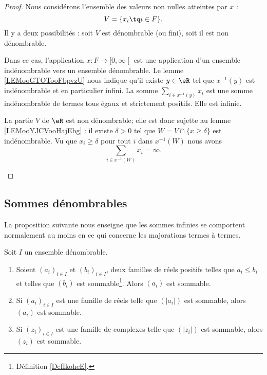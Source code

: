 \begin{proof}
	Nous considérons l'ensemble des valeurs non nulles atteintes par \( x\) :
	\begin{equation}
		V=\{ x_i\tq i\in F \}.
	\end{equation}
	Il y a deux possibilités : soit \( V\) est dénombrable (ou fini), soit il est non dénombrable.

	\begin{subproof}
		Dans ce cas, l'application \( x\colon F\to \mathopen[ 0 , \infty \mathclose[\) est une application d'un ensemble indénombrable vers un ensemble dénombrable. Le lemme \ref{LEMooGTOTooFbpvzU} nous indique qu'il existe \( y\in \eR\) tel que \( x^{-1}(y)\) est indénombrable et en particulier infini. La somme \( \sum_{i\in x^{-1}(y)}x_i\) est une somme indénombrable de termes tous égaux et strictement positifs. Elle est infinie.

		La partie \( V\) de \( \eR\) est non dénombrable; elle est donc sujette au lemme \ref{LEMooYJCVooHajEbg} : il existe \( \delta>0\) tel que \( W=V\cap\{ x\geq \delta \}\) est indénombrable. Vu que \( x_i\geq \delta\) pour tout \( i\) dans \( x^{-1}(W)\) nous avons
		\begin{equation}
			\sum_{i\in x^{-1}(W)}x_i=\infty.
		\end{equation}
	\end{subproof}
\end{proof}

\subsection{Sommes dénombrables}

La proposition suivante nous enseigne que les sommes infinies se comportent normalement au moins en ce qui concerne les majorations termes à termes.
\begin{proposition} \label{PropMpBStL}
	Soit \( I\) un ensemble dénombrable.
	\begin{enumerate}
		\item       \label{ITEMooZSDSooFUqXDO}
		      Soient \( (a_i)_{i\in I}\) et \( (b_i)_{i\in I}\), deux familles de réels positifs telles que \( a_i\leq b_i\) et telles que \( (b_i)\) est sommable\footnote{Définition \ref{DefIkoheE}.}. Alors \( (a_i)\) est sommable.
		\item       \label{ITEMooREEYooOtklRb}
		      Si \( (a_i)_{i\in I}\) est une famille de réels telle que \( (| a_i |)\) est sommable, alors \( (a_i)\) est sommable.
		\item           \label{ITEMooFIGGooWADdLs}
		      Si \( (z_i)_{i\in I}\) est une famille de complexes telle que \( (| z_i |)\) est sommable, alors \( (z_i)\) est sommable.
	\end{enumerate}
\end{proposition}

